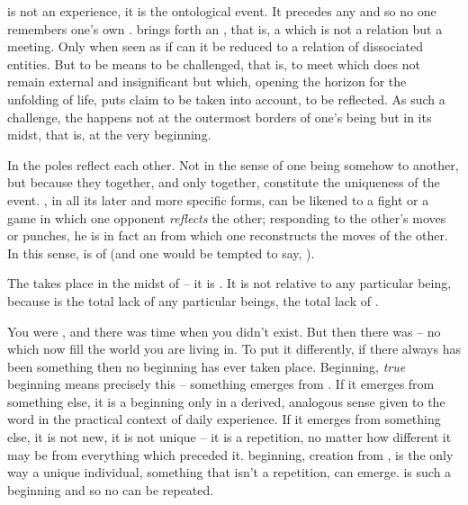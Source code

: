 \pa\label{pa:imago}  is not an experience, it is the ontological
event. It precedes any  and so no one remembers one's own .
 brings forth an , that is, a  which
is not a relation but a meeting. Only when seen as if  can it
be reduced to a relation of dissociated entities. But to be 
means to be challenged, that is, to meet  which does
not remain external and insignificant but which, opening the horizon for the
unfolding of life, puts claim to be taken into account, to be reflected. 
As such a challenge, the  happens not at the outermost
borders of one's being but in its midst, that is, at the very beginning. 

In  the  poles reflect each other. Not in the
sense of one being somehow  to another, but because they together,
and only together, constitute the uniqueness of the event.  ,
in all its later and more specific forms, can be likened to a fight or a game in
which one opponent {\em reflects} the other; responding to the other's moves
or punches, he is in fact an  from which one reconstructs the
moves of the other.
In this sense,  is  of  (and one would
be tempted to say, ).

\pa The   takes place in the midst of
 -- it is . It is not relative to any particular
being, because  is the total lack of any particular beings, the
total lack of .

You were , and there was time when you didn't exist.  But then there
was  -- no  which now fill the world you are living
in.  To put it differently, if there always has been something then no beginning
has ever taken place.  Beginning, {\em true} beginning means precisely this --
something emerges from .  If it emerges from something else, it is a 
beginning only in a derived, analogous sense given to the word in the practical
context of daily experience.  If it emerges from something else, it is not new,
it is not unique -- it is a repetition, no matter how different it may be from
everything which preceded it.   beginning, creation from
, is the only way a unique individual, something that isn't a
repetition, can emerge.   is such a beginning and so no 
can be repeated.

